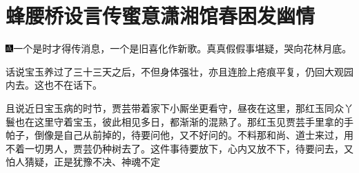 

\chapter{蜂腰桥设言传蜜意\hspace{.5em}潇湘馆春困发幽情}

{\includegraphics[width=3mm]{../Images/00005}一个是时才得传消息，一个是旧喜化作新歌。真真假假事堪疑，哭向花林月底。}

话说宝玉养过了三十三天之后，不但身体强壮，亦且连脸上疮痕平复，仍回大观园内去。这也不在话下。

且说近日宝玉病的时节，贾芸带着家下小厮坐更看守，昼夜在这里，那红玉同众丫鬟也在这里守着宝玉，彼此相见多日，都渐渐的混熟了。那红玉见贾芸手里拿的手帕子，倒像是自己从前掉的，待要问他，又不好问的。不料那和尚、道士来过，用不着一切男人，贾芸仍种树去了。这件事待要放下，心内又放不下，待要问去，又怕人猜疑，正是犹豫不决、神魂不定